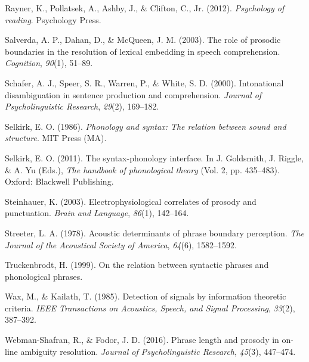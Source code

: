 \documentclass[12pt,oneside]{book}
\begin{document}
\leavevmode\hypertarget{ref-rayner2012psychology}{}%
Rayner, K., Pollatsek, A., Ashby, J., \& Clifton, C., Jr. (2012). \emph{Psychology of reading}. Psychology Press.

\leavevmode\hypertarget{ref-salverda2003role}{}%
Salverda, A. P., Dahan, D., \& McQueen, J. M. (2003). The role of prosodic boundaries in the resolution of lexical embedding in speech comprehension. \emph{Cognition}, \emph{90}(1), 51--89.

\leavevmode\hypertarget{ref-schafer2000intonational}{}%
Schafer, A. J., Speer, S. R., Warren, P., \& White, S. D. (2000). Intonational disambiguation in sentence production and comprehension. \emph{Journal of Psycholinguistic Research}, \emph{29}(2), 169--182.

\leavevmode\hypertarget{ref-Selkirk1986-hc}{}%
Selkirk, E. O. (1986). \emph{Phonology and syntax: The relation between sound and structure}. MIT Press (MA).

\leavevmode\hypertarget{ref-selkirk2011-hp}{}%
Selkirk, E. O. (2011). The syntax-phonology interface. In J. Goldsmith, J. Riggle, \& A. Yu (Eds.), \emph{The handbook of phonological theory} (Vol. 2, pp. 435--483). Oxford: Blackwell Publishing.

\leavevmode\hypertarget{ref-p600addscps}{}%
Steinhauer, K. (2003). Electrophysiological correlates of prosody and punctuation. \emph{Brain and Language}, \emph{86}(1), 142--164.

\leavevmode\hypertarget{ref-streeter1978acoustic}{}%
Streeter, L. A. (1978). Acoustic determinants of phrase boundary perception. \emph{The Journal of the Acoustical Society of America}, \emph{64}(6), 1582--1592.

\leavevmode\hypertarget{ref-Truckenbrodt1999-vd}{}%
Truckenbrodt, H. (1999). On the relation between syntactic phrases and phonological phrases.

\leavevmode\hypertarget{ref-wax1985detection}{}%
Wax, M., \& Kailath, T. (1985). Detection of signals by information theoretic criteria. \emph{IEEE Transactions on Acoustics, Speech, and Signal Processing}, \emph{33}(2), 387--392.

\leavevmode\hypertarget{ref-webman2016phrase}{}%
Webman-Shafran, R., \& Fodor, J. D. (2016). Phrase length and prosody in on-line ambiguity resolution. \emph{Journal of Psycholinguistic Research}, \emph{45}(3), 447--474.
\end{document}
